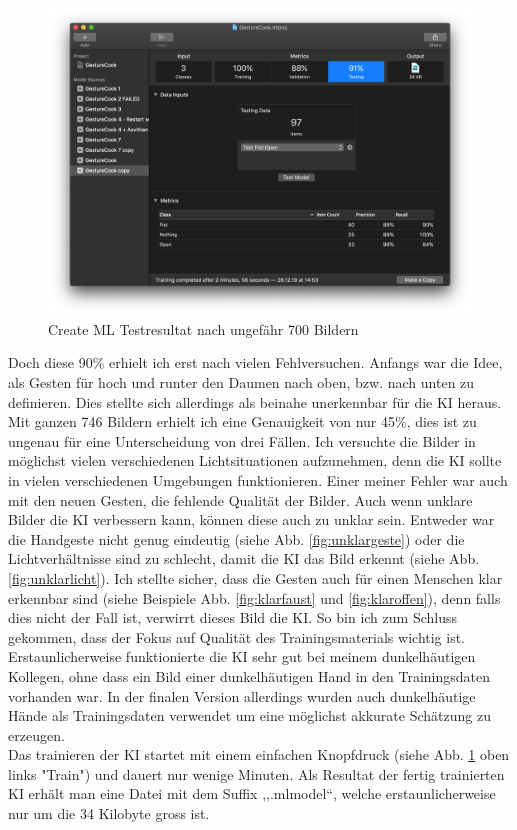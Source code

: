 \documentclass[12pt]{article}
\begin{document}
\begin{figure}
    \includegraphics[width=\linewidth]{pictures/CreateML.png}
    \caption{Create ML Testresultat nach ungefähr 700 Bildern}
    \label{fig:createML}
\end{figure}
Doch diese 90\% erhielt ich erst nach vielen Fehlversuchen. Anfangs war die Idee, als Gesten für hoch und runter den Daumen nach oben, bzw. nach unten zu definieren. Dies stellte sich allerdings als beinahe unerkennbar für die KI heraus. Mit ganzen 746 Bildern erhielt ich eine Genauigkeit von nur 45\%, dies ist zu ungenau für eine Unterscheidung von drei Fällen. Ich versuchte die Bilder in möglichst vielen verschiedenen Lichtsituationen aufzunehmen, denn die KI sollte in vielen verschiedenen Umgebungen funktionieren. Einer meiner Fehler war auch mit den neuen Gesten, die fehlende Qualität der Bilder. Auch wenn unklare Bilder die KI verbessern kann, können diese auch zu unklar sein. Entweder war die Handgeste nicht genug eindeutig (siehe Abb. \ref{fig:unklargeste}) oder die Lichtverhältnisse sind zu schlecht, damit die KI das Bild erkennt (siehe Abb. \ref{fig:unklarlicht}). Ich stellte sicher, dass die Gesten auch für einen Menschen klar erkennbar sind (siehe Beispiele Abb. \ref{fig:klarfaust} und \ref{fig:klaroffen}), denn falls dies nicht der Fall ist, verwirrt dieses Bild die KI. So bin ich zum Schluss gekommen, dass der Fokus auf Qualität des Trainingsmaterials wichtig ist. Erstaunlicherweise funktionierte die KI sehr gut bei meinem dunkelhäutigen Kollegen, ohne dass ein Bild einer dunkelhäutigen Hand in den Trainingsdaten vorhanden war. In der finalen Version allerdings wurden auch dunkelhäutige Hände als Trainingsdaten verwendet um eine möglichst akkurate Schätzung zu erzeugen. \\ Das trainieren der KI startet mit einem einfachen Knopfdruck (siehe Abb. \ref{fig:createML} oben links "Train") und dauert nur wenige Minuten. Als Resultat der fertig trainierten KI erhält man eine Datei mit dem Suffix ,,.mlmodel``, welche erstaunlicherweise nur um die 34 Kilobyte gross ist.
\end{document}
